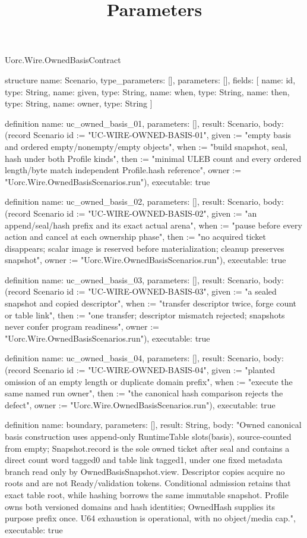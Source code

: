 \begin{lexlean}{Uorc.Wire.OwnedBasisContract}
\title{Parameters}
\begin{semanticmodule}
structure{
  name: Scenario,
  type_parameters: [],
  parameters: [],
  fields: [
    {name: id, type: String},
    {name: given, type: String},
    {name: when, type: String},
    {name: then, type: String},
    {name: owner, type: String}
  ]
}

definition{
  name: uc_owned_basis_01,
  parameters: [],
  result: Scenario,
  body: (record Scenario {id := "UC-WIRE-OWNED-BASIS-01", given := "empty basis and ordered empty/nonempty/empty objects", when := "build snapshot, seal, hash under both Profile kinds", then := "minimal ULEB count and every ordered length/byte match independent Profile.hash reference", owner := "Uorc.Wire.OwnedBasisScenarios.run"}),
  executable: true
}

definition{
  name: uc_owned_basis_02,
  parameters: [],
  result: Scenario,
  body: (record Scenario {id := "UC-WIRE-OWNED-BASIS-02", given := "an append/seal/hash prefix and its exact actual arena", when := "pause before every action and cancel at each ownership phase", then := "no acquired ticket disappears; scalar image is reserved before materialization; cleanup preserves snapshot", owner := "Uorc.Wire.OwnedBasisScenarios.run"}),
  executable: true
}

definition{
  name: uc_owned_basis_03,
  parameters: [],
  result: Scenario,
  body: (record Scenario {id := "UC-WIRE-OWNED-BASIS-03", given := "a sealed snapshot and copied descriptor", when := "transfer descriptor twice, forge count or table link", then := "one transfer; descriptor mismatch rejected; snapshots never confer program readiness", owner := "Uorc.Wire.OwnedBasisScenarios.run"}),
  executable: true
}

definition{
  name: uc_owned_basis_04,
  parameters: [],
  result: Scenario,
  body: (record Scenario {id := "UC-WIRE-OWNED-BASIS-04", given := "planted omission of an empty length or duplicate domain prefix", when := "execute the same named run owner", then := "the canonical hash comparison rejects the defect", owner := "Uorc.Wire.OwnedBasisScenarios.run"}),
  executable: true
}

definition{
  name: boundary,
  parameters: [],
  result: String,
  body: "Owned canonical basis construction uses append-only RuntimeTable slots(basis), source-counted from empty; Snapshot.record is the sole owned ticket after seal and contains a direct count word tagged0 and table link tagged1, under one fixed metadata branch read only by OwnedBasisSnapshot.view. Descriptor copies acquire no roots and are not Ready/validation tokens. Conditional admission retains that exact table root, while hashing borrows the same immutable snapshot. Profile owns both versioned domains and hash identities; OwnedHash supplies its purpose prefix once. U64 exhaustion is operational, with no object/media cap.",
  executable: true
}
\end{semanticmodule}
\end{lexlean}

